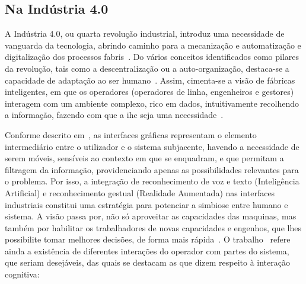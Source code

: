 \subsection{Na Indústria 4.0}
A Indústria 4.0, ou quarta revolução industrial, introduz uma necessidade de vanguarda da tecnologia, abrindo caminho para a mecanização e automatização e digitalização dos processos fabris~\parencite{industry40}. Do vários conceitos identificados como pilares da revolução, tais como a descentralização ou a auto-organização, destaca-se a capacidade de adaptação ao ser humano~\parencite{intelligent_manufacturing_context_industry40_review, industry40}. Assim, cimenta-se a visão de fábricas inteligentes, em que os operadores (operadores de linha, engenheiros e gestores) interagem com um ambiente complexo, rico em dados, intuitivamente recolhendo a informação, fazendo com que a \gls{ihc} seja uma necessidade~\parencite{social_factory, hmi_industry40}.

Conforme descrito em~\textcite{hmi_industry40}, as interfaces gráficas representam o elemento intermediário entre o utilizador e o sistema subjacente, havendo a necessidade de serem móveis, sensíveis ao contexto em que se enquadram, e que permitam a filtragem da informação, providenciando apenas as possibilidades relevantes para o problema. Por isso, a integração de reconhecimento de voz e texto (Inteligência Artificial) e reconhecimento gestual (Realidade Aumentada) nas interfaces industriais constitui uma estratégia para potenciar a simbiose entre humano e sistema. A visão passa por, não só aproveitar as capacidades das maquinas, mas também por habilitar os trabalhadores de novas capacidades e engenhos, que lhes possibilite tomar melhores decisões, de forma mais rápida~\parencite{towards_operator_40_typology}. O trabalho~\textcite{towards_operator_40_typology} refere ainda a existência de diferentes interações do operador com partes do sistema, que seriam desejáveis, das quais se destacam as que dizem respeito à interação cognitiva:


